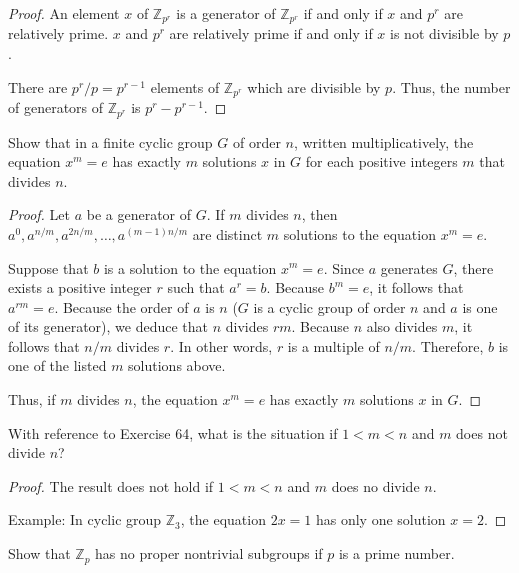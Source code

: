 \begin{proof}
    An element $x$ of $\mathbb{Z}_{{p}^{r}}$ is a generator of $\mathbb{Z}_{{p}^{r}}$ if and only if $x$ and $p^{r}$ are relatively prime. $x$ and $p^{r}$ are relatively prime if and only if $x$ is not divisible by $p$.

    There are $p^{r}/p = p^{r-1}$ elements of $\mathbb{Z}_{{p}^{r}}$ which are divisible by $p$. Thus, the number of generators of $\mathbb{Z}_{{p}^{r}}$ is $p^{r} - p^{r-1}$.
\end{proof}

\newpage
\begin{exercise}
    Show that in a finite cyclic group $G$ of order $n$, written multiplicatively, the equation $x^{m} = e$ has exactly $m$ solutions $x$ in $G$ for each positive integers $m$ that divides $n$.
\end{exercise}

\begin{proof}
    Let $a$ be a generator of $G$. If $m$ divides $n$, then $a^{0}, a^{n/m}, a^{2n/m}, \ldots, a^{(m-1)n/m}$ are distinct $m$ solutions to the equation $x^{m} = e$.

    Suppose that $b$ is a solution to the equation $x^{m} = e$. Since $a$ generates $G$, there exists a positive integer $r$ such that $a^{r} = b$. Because $b^{m} = e$, it follows that $a^{rm} = e$. Because the order of $a$ is $n$ ($G$ is a cyclic group of order $n$ and $a$ is one of its generator), we deduce that $n$ divides $rm$. Because $n$ also divides $m$, it follows that $n/m$ divides $r$. In other words, $r$ is a multiple of $n/m$. Therefore, $b$ is one of the listed $m$ solutions above.

    Thus, if $m$ divides $n$, the equation $x^{m} = e$ has exactly $m$ solutions $x$ in $G$.
\end{proof}

\newpage
\begin{exercise}
    With reference to Exercise 64, what is the situation if $1 < m < n$ and $m$ does not divide $n$?
\end{exercise}

\begin{proof}
    The result does not hold if $1 < m < n$ and $m$ does no divide $n$.

    Example: In cyclic group $\mathbb{Z}_{3}$, the equation $2x = 1$ has only one solution $x = 2$.
\end{proof}

\newpage
\begin{exercise}
    Show that $\mathbb{Z}_{p}$ has no proper nontrivial subgroups if $p$ is a prime number.
\end{exercise}

